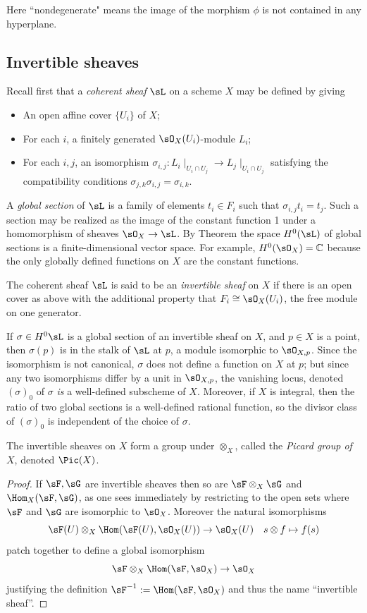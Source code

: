 Here ``nondegenerate" means the image of the morphism $\phi$ is not contained in any hyperplane. 



\subsection{Invertible sheaves}
Recall first that a \emph{coherent sheaf} $\sL$ on a scheme $X$ may be defined by
giving 
\begin{itemize}
 \item An open affine cover $\{U_{i}\}$ of $X$; 
 \item For each $i$, a finitely generated $\sO_{X}(U_{i})$-module $L_{i}$;
 \item For each $i,j$, an isomorphism $\sigma_{i,j}: L_{i}\mid_{U_{i}\cap U_{j}} \to L_{j}\mid_{U_{i}\cap U_{j}}$
 satisfying the compatibility conditions $\sigma_{j,k}\sigma_{i,j} = \sigma_{i,k}$. 
 \end{itemize}

A \emph{global section} of $\sL$ is a family of elements $t_{i}\in F_{i}$ such that 
$\sigma_{i,j} t_{i} = t_{j}$. Such a section may be realized as the image of the constant function 1 under
a homomorphism of sheaves $\sO_{X} \to \sL$. By Theorem \cite[Thm III.5.2]{H} the space $H^{0}(\sL)$  of global sections is
a finite-dimensional vector space. For example, $H^{0}(\sO_{X}) = \CC$ because the only globally defined
functions on $X$ are the constant functions.

The coherent sheaf $\sL$ is said to be an \emph{invertible sheaf} on $X$ if there is an open cover as above with the additional property
that $F_{i} \cong \sO_X(U_{i})$, the free module on one generator. 

If $\sigma \in H^0\sL$ is a global section of an invertible sheaf
on $X$, and $p\in X$ is a point, then $\sigma(p)$ is in the stalk of $\sL$ at $p$, a module isomorphic to $\sO_{X,p}$. Since the isomorphism is not canonical, $\sigma$ does not define a function on $X$ at $p$; but since any two isomorphisms
differ by a unit in $\sO_{X,p}$, the vanishing locus, denoted $(\sigma)_0$ of $\sigma$ \emph{is} a well-defined subscheme of $X$. Moreover, if $X$ is integral, then the ratio of two global sections is a well-defined rational function, so the divisor class of 
$(\sigma)_0$ is independent of the choice of $\sigma$.

\begin{proposition}
 The invertible sheaves on $X$ form a group under $\otimes_{X}$, called the 
\emph{Picard group of $X$}, denoted $\Pic(X)$. 
\end{proposition}
\begin{proof}
 If $\sF, \sG$ are invertible sheaves then so are $\sF\otimes_{X}\sG$ and  $\Hom_{X}(\sF, \sG)$, as one sees immediately by
restricting to the open sets where $\sF$ and $\sG$ are isomorphic to $\sO_{X}$. Moreover the natural isomorphisms
$$
\sF(U) \otimes_{X} \Hom(\sF(U), \sO_{X}(U)) \to \sO_{X}(U)\quad s \otimes f \mapsto f(s)
$$ 
patch together to define a global isomorphism 
$$
\sF \otimes_{X} \Hom(\sF, \sO_{X}) \to \sO_{X}
$$
justifying the definition
$\sF^{-1} := \Hom(\sF, \sO_{X})$ and thus the name ``invertible sheaf''. 
\end{proof}
 
